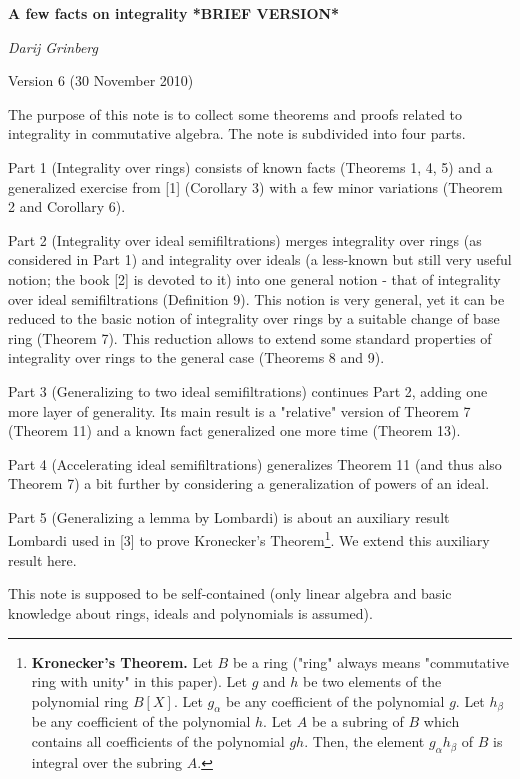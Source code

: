 \documentclass[12pt,final,notitlepage,onecolumn]{article}%
\begin{document}
\color{black}

\begin{center}
\textbf{A few facts on integrality *BRIEF VERSION*}

\textit{Darij Grinberg}

Version 6 (30 November 2010)
\end{center}

The purpose of this note is to collect some theorems and proofs related to
integrality in commutative algebra. The note is subdivided into four parts.

Part 1 (Integrality over rings) consists of known facts (Theorems 1, 4, 5) and
a generalized exercise from [1] (Corollary 3) with a few minor variations
(Theorem 2 and Corollary 6).

Part 2 (Integrality over ideal semifiltrations) merges integrality over rings
(as considered in Part 1) and integrality over ideals (a less-known but still
very useful notion; the book [2] is devoted to it) into one general notion -
that of integrality over ideal semifiltrations (Definition 9). This notion is
very general, yet it can be reduced to the basic notion of integrality over
rings by a suitable change of base ring (Theorem 7). This reduction allows to
extend some standard properties of integrality over rings to the general case
(Theorems 8 and 9).

Part 3 (Generalizing to two ideal semifiltrations) continues Part 2, adding
one more layer of generality. Its main result is a "relative" version of
Theorem 7 (Theorem 11) and a known fact generalized one more time (Theorem 13).

Part 4 (Accelerating ideal semifiltrations) generalizes Theorem 11 (and thus
also Theorem 7) a bit further by considering a generalization of powers of an ideal.

Part 5 (Generalizing a lemma by Lombardi) is about an auxiliary result
Lombardi used in [3] to prove Kronecker's Theorem\footnote{\textbf{Kronecker's
Theorem.} Let $B$ be a ring ("ring" always means "commutative ring with unity"
in this paper). Let $g$ and $h$ be two elements of the polynomial ring
$B\left[  X\right]  $. Let $g_{\alpha}$ be any coefficient of the polynomial
$g$. Let $h_{\beta}$ be any coefficient of the polynomial $h$. Let $A$ be a
subring of $B$ which contains all coefficients of the polynomial $gh$. Then,
the element $g_{\alpha}h_{\beta}$ of $B$ is integral over the subring $A$.}.
We extend this auxiliary result here.

This note is supposed to be self-contained (only linear algebra and basic
knowledge about rings, ideals and polynomials is assumed).
\end{document}
